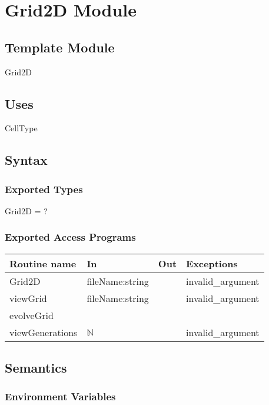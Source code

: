 \documentclass[12pt]{article}
\begin{document}
\section* {Grid2D Module}

\subsection*{Template Module}

Grid2D

\subsection* {Uses}

CellType

\subsection* {Syntax}

\subsubsection* {Exported Types}

Grid2D = ?

\subsubsection* {Exported Access Programs}

\begin{tabular}{| l | l | l | l |}
\hline
\textbf{Routine name} & \textbf{In} & \textbf{Out} & \textbf{Exceptions}\\
\hline
Grid2D & fileName:string & ~ & invalid\_argument\\
\hline
viewGrid & fileName:string & ~ & invalid\_argument\\
\hline
evolveGrid & ~ & ~ & ~\\
\hline
viewGenerations & $ \mathbb{N} $ & ~ & invalid\_argument\\
\hline
\end{tabular}

\subsection* {Semantics}

\subsubsection*{Environment Variables}
\end{document}
